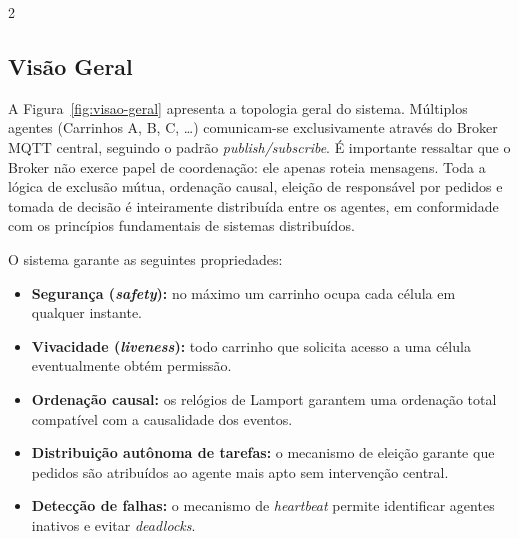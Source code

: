 \documentclass[a4paper]{article}
\begin{document}
\begin{multicols}{2}
\setlength{\columnsep}{0.5cm}

\subsection{Vis\~ao Geral}

A Figura~\ref{fig:visao-geral} apresenta a topologia geral do sistema. M\'ultiplos agentes (Carrinhos A, B, C, \ldots) comunicam-se exclusivamente atrav\'es do Broker MQTT central, seguindo o padr\~ao \textit{publish/subscribe}. \'E importante ressaltar que o Broker n\~ao exerce papel de coordena\c{c}\~ao: ele apenas roteia mensagens. Toda a l\'ogica de exclus\~ao m\'utua, ordena\c{c}\~ao causal, elei\c{c}\~ao de respons\'avel por pedidos e tomada de decis\~ao \'e inteiramente distribu\'ida entre os agentes, em conformidade com os princ\'ipios fundamentais de sistemas distribu\'idos.

O sistema garante as seguintes propriedades:
\begin{itemize}
    \item \textbf{Seguran\c{c}a (\textit{safety}):} no m\'aximo um carrinho ocupa cada c\'elula em qualquer instante.
    \item \textbf{Vivacidade (\textit{liveness}):} todo carrinho que solicita acesso a uma c\'elula eventualmente obt\'em permiss\~ao.
    \item \textbf{Ordena\c{c}\~ao causal:} os rel\'ogios de Lamport garantem uma ordena\c{c}\~ao total compat\'ivel com a causalidade dos eventos.
    \item \textbf{Distribui\c{c}\~ao aut\^onoma de tarefas:} o mecanismo de elei\c{c}\~ao garante que pedidos s\~ao atribu\'idos ao agente mais apto sem interven\c{c}\~ao central.
    \item \textbf{Detec\c{c}\~ao de falhas:} o mecanismo de \textit{heartbeat} permite identificar agentes inativos e evitar \textit{deadlocks}.
\end{itemize}

\end{multicols}
\end{document}

